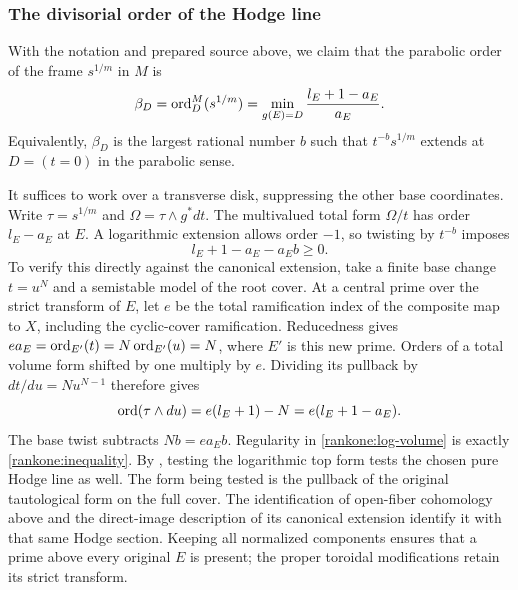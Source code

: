 \subsubsection{The divisorial order of the Hodge line}

With the notation and prepared source above, we claim that the
parabolic order of the frame $s^{1/m}$ in $M$ is
\begin{equation}\label{rankone:order}
 \beta_D=\operatorname{ord}_D^M(s^{1/m})
     =\min_{g(E)=D}\frac{l_E+1-a_E}{a_E}.
\end{equation}
Equivalently, $\beta_D$ is the largest rational number $b$ such that
$t^{-b}s^{1/m}$ extends at $D=(t=0)$ in the parabolic sense.

It suffices to work over a transverse disk, suppressing the other
base coordinates.  Write $\tau=s^{1/m}$ and
$\Omega=\tau\wedge g^*dt$.  The multivalued total form
$\Omega/t$ has order $l_E-a_E$ at $E$.  A logarithmic extension
allows order $-1$, so twisting by $t^{-b}$ imposes
\begin{equation}\label{rankone:inequality}
 l_E+1-a_E-a_Eb\geq0.
\end{equation}
To verify this directly against the canonical extension, take a
finite base change $t=u^N$ and a semistable model of the root
cover.  At a central prime over the strict transform of $E$, let
$e$ be the total ramification index of the composite map to $X$,
including the cyclic-cover ramification.  Reducedness gives
$ea_E=\operatorname{ord}_{E'}(t)=N\operatorname{ord}_{E'}(u)=N$, where $E'$ is this new prime.
Orders of a total volume form shifted by one multiply by $e$.
Dividing its pullback by
$dt/du=Nu^{N-1}$ therefore gives
\[
 \operatorname{ord}(\tau\wedge du)
 =e(l_E+1)-N
 =e(l_E+1-a_E).
\]
The base twist subtracts $Nb=ea_Eb$.  Regularity in
\eqref{rankone:log-volume} is exactly
\eqref{rankone:inequality}.  By , testing
the logarithmic top form tests the chosen pure Hodge line as well.
The form being tested is the pullback of the original tautological
form on the full cover. The identification of open-fiber cohomology
above and the direct-image description of its canonical extension
identify it with that same Hodge section. Keeping all normalized
components ensures that a prime above every original $E$ is present;
the proper toroidal modifications retain its strict transform.


